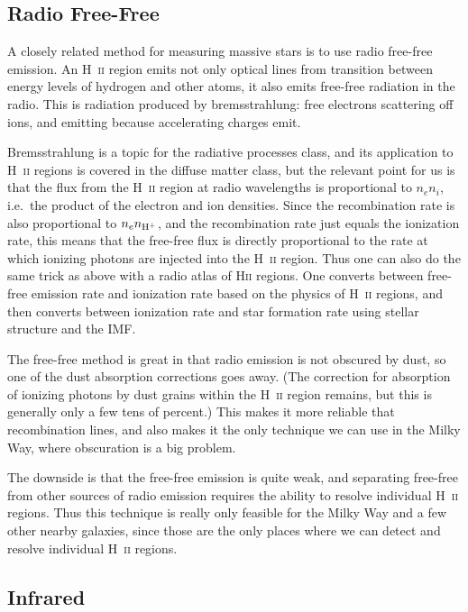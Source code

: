\subsection{Radio Free-Free}

A closely related method for measuring massive stars is to use radio free-free emission. An H~\textsc{ii} region emits not only optical lines from transition between energy levels of hydrogen and other atoms, it also emits free-free radiation in the radio. This is radiation produced by bremsstrahlung: free electrons scattering off ions, and emitting because accelerating charges emit.

Bremsstrahlung is a topic for the radiative processes class, and its application to H~\textsc{ii} regions is covered in the diffuse matter class, but the relevant point for us is that the flux from the H~\textsc{ii} region at radio wavelengths is proportional to $n_e n_i$, i.e.\ the product of the electron and ion densities. Since the recombination rate is also proportional to $n_e n_{\rm H^+}$, and the recombination rate just equals the ionization rate, this means that the free-free flux is directly proportional to the rate at which ionizing photons are injected into the H~\textsc{ii} region. Thus one can also do the same trick as above with a radio atlas of H\textsc{ii} regions. One converts between free-free emission rate and ionization rate based on the physics of H~\textsc{ii} regions, and then converts between ionization rate and star formation rate using stellar structure and the IMF. 

The free-free method is great in that radio emission is not obscured by dust, so one of the dust absorption corrections goes away. (The correction for absorption of ionizing photons by dust grains within the H~\textsc{ii} region remains, but this is generally only a few tens of percent.) This makes it more reliable that recombination lines, and also makes it the only technique we can use in the Milky Way, where obscuration is a big problem.

The downside is that the free-free emission is quite weak, and separating free-free from other sources of radio emission requires the ability to resolve individual H~\textsc{ii} regions. Thus this technique is really only feasible for the Milky Way and a few other nearby galaxies, since those are the only places where we can detect and resolve individual H~\textsc{ii} regions.

\subsection{Infrared}

